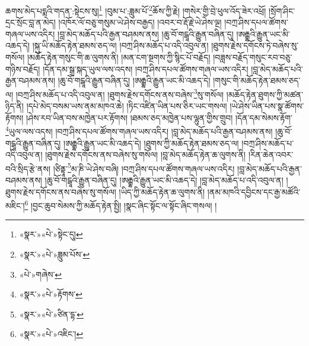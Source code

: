 ཆགས་མེད་པདྨའི་གདན་:སྟེངས་སུ།\footnote{«སྣར་»«པེ་»སྟེང་དུ།} །བུམ་པ་:ཟླུམ་པོ་\footnote{«སྣར་»«པེ་»ཟླུམ་པོས་}ཆོས་ཀྱི་རྗེ། །གསེར་གྱི་བྲེ་ཕུལ་འོད་ཟེར་འཕྲོ། །སྲོག་ཤིང་དྲང་སྲོང་བླ་ན་མེད། །འཁོར་ལོ་བཅུ་གསུམ་ཡེ་ཤེས་བརྒྱད། །འབར་བ་རྡོ་རྗེ་ཡེ་ཤེས་ལྔ། །བཀྲ་ཤིས་དཔལ་ཚོགས་གཞལ་ཡས་འདིར། །བླ་མེད་མཆོད་པའི་རྒྱན་བཤམས་ནས། །ཆུ་བོ་གངྒཱའི་རྒྱུན་བཞིན་དུ། །ཨརྒྷའི་རྒྱུན་ཡང་མི་འཆད་དེ། །སྐུ་ཡི་མཆོད་རྟེན་ཐམས་ཅད་ལ། །བཀྲ་ཤིས་མཆོད་པ་འདི་འབུལ་ན། །ཐུགས་རྗེས་དགོངས་ཏེ་བཞེས་སུ་གསོལ། །མཆོད་རྟེན་གསུང་གི་ཆ་ལུགས་ནི། །མན་ངག་སྔགས་ཀྱི་སྙིང་པོ་བརྗོད། །བཟླས་བརྗོད་གསུང་རབ་བཅུ་གཉིས་བརྗོད། །དོན་དམ་སྒྲ་སྐད་ཡུལ་ལས་འདས། །བཀྲ་ཤིས་དཔལ་ཚོགས་གཞལ་ཡས་འདིར། །བླ་མེད་མཆོད་པའི་རྒྱན་བཤམས་ནས། །ཆུ་བོ་གངྒཱའི་རྒྱུན་བཞིན་དུ། །ཨརྒྷའི་རྒྱུན་ཡང་མི་འཆད་དེ། །གསུང་གི་མཆོད་རྟེན་ཐམས་ཅད་ལ། །བཀྲ་ཤིས་མཆོད་པ་འདི་འབུལ་ན། །ཐུགས་རྗེས་དགོངས་ནས་བཞེས་\footnote{«པེ་»གཞེས་}སུ་གསོལ། །མཆོད་རྟེན་ཐུགས་ཀྱི་མཚན་ཉིད་ནི། །དཔེ་མེད་བསམ་ཡས་ནམ་མཁའ་ཆེ། །ཏིང་འཛིན་ཡིན་པས་ཅིར་ཡང་གསལ། །ཡེ་ཤེས་ཡིན་པས་སྣ་ཚོགས་རྟོགས། །ཤེས་རབ་ཡིན་བས་མཁྱེན་པར་རྟོགས། །ཐམས་ཅད་མཁྱེན་པས་ལྷུན་གྱིས་གྲུབ། །དོན་དམ་སེམས་རྟོག་\footnote{«སྣར་»«པེ་»རྟོགས་}ཡུལ་ལས་འདས། །བཀྲ་ཤིས་དཔལ་ཚོགས་གཞལ་ཡས་འདིར། །བླ་མེད་མཆོད་པའི་རྒྱན་བཤམས་ནས། །ཆུ་བོ་གངྒཱའི་རྒྱུན་བཞིན་དུ། །ཨརྒྷའི་རྒྱུན་ཡང་མི་འཆད་དེ། །ཐུགས་ཀྱི་མཆོད་རྟེན་ཐམས་ཅད་ལ། །བཀྲ་ཤིས་མཆོད་པ་འདི་འབུལ་ན། །ཐུགས་རྗེས་དགོངས་ནས་བཞེས་སུ་གསོལ། །བླ་མེད་མཆོད་རྟེན་ཆ་ལུགས་ནི། །རིན་ཆེན་འབར་བའི་སྲིད་རྩེ་ནས། །ཙིནྟཱ་\footnote{«སྣར་»«པེ་»ཙིན་དྷ་}མ་ཎི་ཡེ་ཤེས་བཞི། །བཀྲ་ཤིས་དཔལ་ཚོགས་གཞལ་ཡས་འདིར། །བླ་མེད་མཆོད་པའི་རྒྱན་བཤམས་ནས། །ཆུ་བོ་གངྒཱའི་རྒྱུན་བཞིན་དུ། །ཨརྒྷའི་རྒྱུན་ཡང་མི་འཆད་དེ། །བླ་མེད་མཆོད་པ་འདི་འབུལ་ན། །ཐུགས་རྗེས་དགོངས་ནས་བཞེས་སུ་གསོལ། །ཡིད་ཀྱི་མཆོད་རྟེན་ཆ་ལུགས་ནི། །ནམ་མཁའི་དབྱིངས་དང་རྒྱ་མཚོའི་མཇིང་།\footnote{«སྣར་»«པེ་»འཇིང་།} །བྱང་ཆུབ་སེམས་ཀྱི་མཆོད་རྟེན་སྤྱི། །སྣང་ཞིང་སྟོང་ལ་སྟོང་ཞིང་གསལ། །
